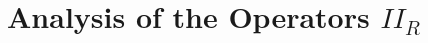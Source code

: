 \begin{comment}
%
\[ R^{\frac{d+1}{2}} \int \int_{E_{x_0}} \int_{F_y^{-1}(E_{x_0})} c_{t_0,t_1}(s) \eta(s,y,z) (\partial^{\frac{d-1}{2}} \widehat{\chi} )(R(s + |z|))\; dz\; dy\; ds. \]
%
TODO: Does integrating by parts in the $t$ and $t'$ variable do anything for us? Is this where we need oscillation. If $|t_0 - t_1 + d_g(x_0,x_1)| \geq 10/R$, then we conclude this quantity is
%
\begin{align*}
    & O_N \Big( R^{\frac{d+1}{2}-N} \int \int_{E_{x_0}} \int_{F_y^{-1}(E_{x_0})} |c_{t_0,t_1}(s)| |\eta(s,y,z)| (s + |z|)^{-N}\; dz\; dy\; ds \Big)\\
    &\quad\quad O_N \Big( R^{\frac{d+1}{2} - N} |t_0 - t_1 + d_g(x_0,x_1)|^{-N} |E_{x_0}| |E_{x_1}| \| c_{t_0,t_1} \|_{L^1} \Big)
\end{align*}
%
If $|E_{x_0}|$ and $|E_{x_1}|$ are both proportional to $1/R^d$, then this quantity is
%
\begin{align*}
    & O_N \Big( R^{-\frac{3d-1}{2} - N} |t_0 - t_1 + d_g(x_0,x_1)|^{-N} \| c_{t_0,t_1} \|_{L^1} \Big)\\
    &\quad = O_N \Big( R^{-\frac{3d-1}{2} - 1/p^* - N} (t_0 - t_1 + d_g(x_0,x_1))^{-N} \| b_{t_0} \|_{L^p} \| b_{t_1} \|_{L^p} \Big)\\
    &\quad = O_N \Big( t_0^{s_p} t_1^{s_p} R^{-\frac{3d-1}{2} - 1/p^* - N} (t_0 - t_1 + d_g(E_{x_0}, E_{x_1}))^{-N} \Big)
\end{align*}

\end{comment}



\section{Analysis of the Operators $II_R$}

